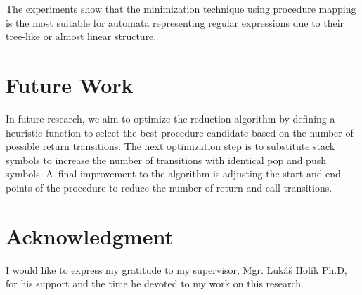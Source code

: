     The experiments show that the minimization technique using procedure mapping is the most suitable for automata representing regular expressions due to their tree-like or almost linear structure.

\section{Future Work}
    In future research, we aim to optimize the reduction algorithm by defining a heuristic function to select the best procedure candidate based on the number of possible return transitions. The next optimization step is to substitute stack symbols to increase the number of transitions with identical pop and push symbols. A~final improvement to the algorithm is adjusting the start and end points of the procedure to reduce the number of return and call transitions.

\section{Acknowledgment}
    I would like to express my gratitude to my supervisor, Mgr. Lukáš Holík Ph.D, for his support and the time he devoted to my work on this research.

